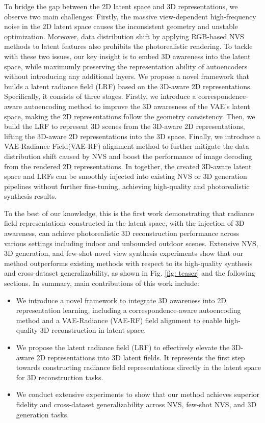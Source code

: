 To bridge the gap between the 2D latent space and 3D representations, we observe two main challenges: Firstly, the massive view-dependent high-frequency noise in the 2D latent space causes the inconsistent geometry and unstable optimization. Moreover, data distribution shift by applying RGB-based NVS methods to latent features also prohibits the photorealistic rendering. To tackle with these two issues, our key insight is to embed 3D awareness into the latent space, while maximumly preserving the representation ability of autoencoders without introducing any additional layers. 
We propose a novel framework that builds a latent radiance field (LRF) based on the 3D-aware 2D representations. 
Specifically, it consists of three stages. Firstly, we introduce a correspondence-aware autoencoding method to improve the 3D awaresness of the VAE's latent space, making the 2D representations follow the geometry consistency. Then, we build the LRF to represent 3D scenes from the 3D-aware 2D representations, lifting the 3D-aware 2D representations into the 3D space. Finally, we introduce a VAE-Radiance Field(VAE-RF) alignment method to further mitigate the data distribution shift caused by NVS and boost the performance of image decoding from the rendered 2D representations.
In together, the created 3D-aware latent space and LRFs can be smoothly injected into existing NVS or 3D generation pipelines without further fine-tuning, achieving high-quality and photorealistic synthesis results. 

To the best of our knowledge, this is the first work demonstrating that radiance field representations constructed in the latent space, with the injection of 3D awareness,  can achieve photorealistic 3D reconstruction performance across various settings including indoor and unbounded outdoor scenes.
Extensive NVS, 3D generation, and few-shot novel view synthesis experiments show that our method outperforms existing methods with respect to its high-quality synthesis and cross-dataset generalizability, as shown in Fig. \ref{fig: teaser} and the following sections. 
In summary, main contributions of this work include:
\begin{itemize}[leftmargin=*]
    \item We introduce a novel framework to integrate 3D awareness into 2D representation learning, including a correspondence-aware autoencoding method and a VAE-Radiance (VAE-RF) field alignment to enable high-quality 3D reconstruction in latent space.
    \item We propose the latent radiance field (LRF) to effectively elevate the 3D-aware 2D representations into 3D latent fields. It represents the first step towards constructing radiance field representations directly in the latent space for 3D reconstruction tasks. 
    \item We conduct extensive experiments to show that our method achieves superior fidelity and cross-dataset generalizability across NVS, few-shot NVS, and 3D generation tasks.
\end{itemize}




